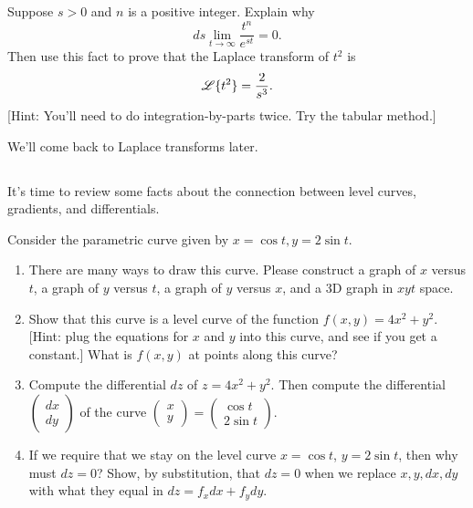 \begin{problem}
Suppose $s>0$ and $n$ is a positive integer.  Explain why $$ds\lim_{t\to\infty}\frac{t^n}{e^{st}}=0.$$ 
Then use this fact to prove that the Laplace transform of $t^2$ is $$\displaystyle\mathscr{L}\{t^2\} =\frac{2}{s^3}.$$ [Hint: You'll need to do integration-by-parts twice. Try the tabular method.]
\end{problem}

We'll come back to Laplace transforms later. 

\subsection*{\ideaA}



It's time to review some facts about the connection between level curves, gradients, and differentials. 
\begin{problem}
Consider the parametric curve given by $x=\cos t, y=2\sin t$.  
\begin{enumerate}
 \item There are many ways to draw this curve.  Please construct a graph of $x$ versus $t$, a graph of $y$ versus $t$, a graph of $y$ versus $x$, and a 3D graph in $xyt$ space. 
 \item Show that this curve is a level curve of the function $f(x,y) = 4x^2+y^2$. [Hint: plug the equations for $x$ and $y$ into this curve, and see if you get a constant.] What is $f(x,y)$ at points along this curve?
 \item Compute the differential $dz$ of $z=4x^2+y^2$. Then compute the differential 
$\begin{pmatrix}dx\\dy\end{pmatrix}$ 
of the curve 
$\begin{pmatrix}x\\y\end{pmatrix} = 
\begin{pmatrix}\cos t\\2\sin t\end{pmatrix}$.
 \item 
If we require that we stay on the level curve $x = \cos t$, $y=2\sin t$, then why must $dz=0$?  Show, by substitution, that $dz=0$ when we replace $x,y,dx,dy$ with what they equal in $dz = f_xdx+f_ydy$.
\end{enumerate}
\end{problem}

